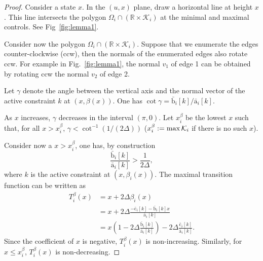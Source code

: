 \documentclass[journal]{IEEEtran}
\theoremstyle{plain}
\theoremstyle{definition}
\theoremstyle{definition}
\renewcommand{\vec}[1]{\bm{\mathrm{#1}}}  %
\begin{document}
\begin{proof}
  Consider a state $x$. In the $(u,x)$ plane, draw a horizontal line
  at height $x$. This line intersects the polygon
  $\Omega_{i}\cap (\mathbb{R}\times \mathcal{K}_{i})$ at the minimal
  and maximal controls. See Fig~\ref{fig:lemma1}.

   
  Consider now the polygon $\Omega_{i}\cap (\mathbb{R}\times
  \mathcal{K}_{i})$.  Suppose that we enumerate the edges
  counter-clockwise (ccw), then the normals of the enumerated edges
  also rotate ccw. For example in Fig.~\ref{fig:lemma1}, the normal
  $v_1$ of edge 1 can be obtained by rotating ccw the normal $v_2$ of
  edge 2.

  Let $\gamma$ denote the angle between the vertical axis and the
  normal vector of the active constraint $k$ at $(x, \beta(x))$. One
  has $\cot{\gamma} = \bar{\vec b}_i[k] / \bar{\vec a}_i[k]$.  

  As $x$ increases, $\gamma$ decreases in the interval $(\pi, 0)$. Let
  $x^\beta_i$ be the lowest $x$ such that, for all $x > x^\beta_i$,
  $\gamma < \cot^{-1}{(1 / (2 \Delta))}$ ($x^\beta_i:=\max{\cal K}_i$ if
  there is no such $x$). 

  Consider now a $x > x^\beta_i$, one has, by construction
  \begin{equation}
    \label{eq:mono-cond}
    \frac{\bar{\vec b}_i[k]}{\bar{\vec a}_i[k]} >
    \frac{1}{2\Delta},
  \end{equation}
  where $k$ is the active constraint at $(x,\beta_i(x))$.
  The maximal transition function can be written as
  \begin{equation}
    \label{eq:2}
    \begin{aligned}
    T_i^\beta(x) &= x + 2 \Delta \beta_i(x)\\
    &= x + 2 \Delta \frac{- \bar{\vec c}_i[k] - \bar{\vec b}_i[k] x}{\bar{\vec a}_i[k]}\\
    &= x\left(1 - 2 \Delta \frac{\bar{\vec b}_i[k]}{\bar{\vec a}_i[k]}\right)
    - 2 \Delta \frac{\bar{\vec c}_i[k]}{\bar{\vec a}_i[k]}.
    \end{aligned}
  \end{equation}
  Since the coefficient of $x$ is negative, $T_i^\beta(x)$ is
  non-increasing. Similarly, for $x \leq x^\beta_i$, $T_i^\beta(x)$
  is non-decreasing. 
\end{proof}
\end{document}
